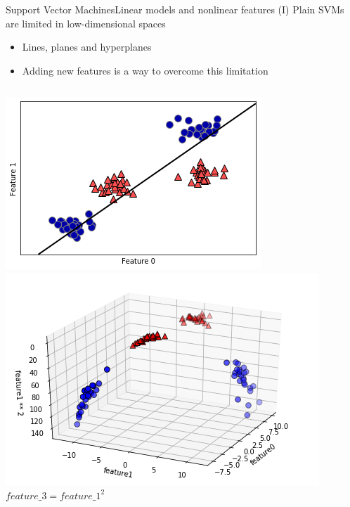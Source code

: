 \documentclass[10pt,compress]{beamer} %
\begin{document}
\begin{frame}{Support Vector Machines}{Linear models and nonlinear features (I)}
    Plain SVMs are limited in low-dimensional spaces
    \begin{itemize}
        \item Lines, planes and hyperplanes
        \item Adding new features is a way to overcome this limitation
    \end{itemize}

    \begin{columns}[T]
            \includegraphics[width=\linewidth]{figs/svm-1.png}
            \includegraphics[width=\linewidth]{figs/svm-2.png}
            \centering $feature\_3 = feature\_1^2$
    \end{columns}
\end{frame}
\end{document}
